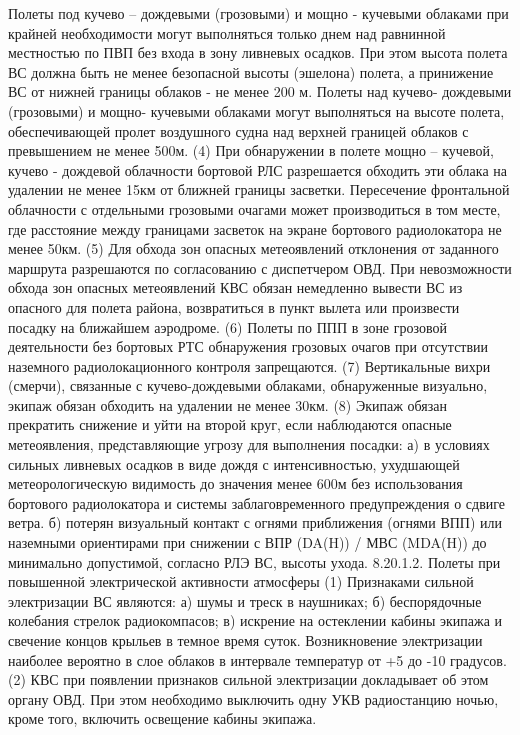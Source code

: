 Полеты под кучево – дождевыми (грозовыми) и мощно - кучевыми облаками при крайней необходимости могут выполняться только днем над равнинной местностью по ПВП без входа в зону ливневых осадков. При этом высота полета ВС должна быть не менее безопасной высоты (эшелона) полета, а принижение ВС от нижней границы облаков - не менее 200 м.
Полеты над кучево- дождевыми (грозовыми) и мощно- кучевыми облаками могут выполняться на высоте полета, обеспечивающей пролет воздушного судна над верхней границей облаков с превышением не менее 500м.
(4) При обнаружении в полете мощно – кучевой, кучево - дождевой облачности бортовой РЛС разрешается обходить эти облака на удалении не менее 15км от ближней границы засветки. Пересечение фронтальной облачности с отдельными грозовыми очагами может производиться в том месте, где расстояние между границами засветок на экране бортового радиолокатора не менее 50км.
(5) Для обхода зон опасных метеоявлений отклонения от заданного маршрута разрешаются по согласованию с диспетчером ОВД. При невозможности обхода зон опасных метеоявлений КВС обязан немедленно вывести ВС из опасного для полета района, возвратиться в пункт вылета или произвести посадку на ближайшем аэродроме.
(6) Полеты по ППП в зоне грозовой деятельности без бортовых РТС обнаружения грозовых очагов при отсутствии наземного радиолокационного контроля запрещаются.
(7) Вертикальные вихри (смерчи), связанные с кучево-дождевыми облаками, обнаруженные визуально, экипаж обязан обходить на удалении не менее 30км.
(8) Экипаж обязан прекратить снижение и уйти на второй круг, если наблюдаются опасные метеоявления, представляющие угрозу для выполнения посадки:
а)	в условиях сильных ливневых осадков в виде дождя с интенсивностью, ухудшающей метеорологическую видимость до значения менее 600м без использования бортового радиолокатора и системы заблаговременного предупреждения о сдвиге ветра.
б)	потерян визуальный контакт с огнями приближения (огнями ВПП) или наземными ориентирами при снижении с ВПР (DA(H)) / МВС (MDA(H)) до минимально допустимой, согласно РЛЭ ВС, высоты ухода.
8.20.1.2.	Полеты при повышенной электрической активности атмосферы
(1) Признаками сильной электризации ВС являются:
а)	шумы и треск в наушниках;
б)	беспорядочные колебания стрелок радиокомпасов;
в)	искрение на остеклении кабины экипажа и свечение концов крыльев в темное время суток.
Возникновение электризации наиболее вероятно в слое облаков в интервале температур от +5 до -10 градусов.
(2) КВС при появлении признаков сильной электризации докладывает об этом органу ОВД. При этом необходимо выключить одну УКВ радиостанцию ночью, кроме того, включить освещение кабины экипажа.
